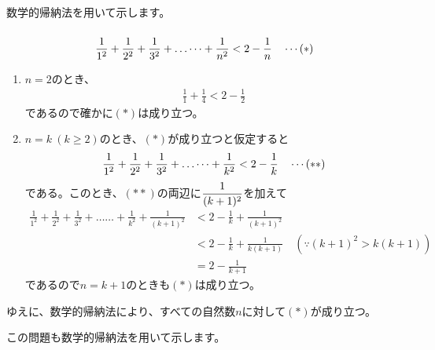 \documentclass[a4paper]{ltjsarticle}
\begin{document}

\clearpage
{}
数学的帰納法を用いて示します。

\begin{ans*}
  ${}$
  \begin{gather*}
    \frac{1}{1^2} +
    \frac{1}{2^2} +
    \frac{1}{3^2} + \dots\dots + \frac{1}{n^2} < 2 - \frac{1}{n} \quad\cdots\rm{(*)}
  \end{gather*}
  \begin{enumerate}[label=(\roman*), ref=(\roman*), itemsep=0pt]
    \item $n=2$のとき、
    \begin{gather*}
      \frac{1}{1} + \frac{1}{4} < 2 - \frac{1}{2}
    \end{gather*}
    であるので確かに$(*)$は成り立つ。
    \item $n=k\:(k\geq 2)$のとき、$(*)$が成り立つと仮定すると
    \begin{gather*}
      \frac{1}{1^2} +
      \frac{1}{2^2} +
      \frac{1}{3^2} + \dots\dots + \frac{1}{k^2} < 2 - \frac{1}{k} \quad\cdots\rm{(**)}
    \end{gather*}
    である。このとき、$(**)$の両辺に$\disp \frac{1}{(k+1)^{2}}$を加えて
    \begin{align*}
      \frac{1}{1^2} +
      \frac{1}{2^2} +
      \frac{1}{3^2} + \dots\dots + \frac{1}{k^2} + \frac{1}{(k+1)^{2}}
      &< 2 - \frac{1}{k} + \frac{1}{(k+1)^{2}} \\
      &< 2 - \frac{1}{k} + \frac{1}{k(k+1)} \quad (\because (k+1)^{2} > k(k+1)) \\
      &= 2 - \frac{1}{k+1}
    \end{align*}
    であるので$n=k+1$のときも$(*)$は成り立つ。
  \end{enumerate}
  ゆえに、数学的帰納法により、すべての自然数$n$に対して$(*)$が成り立つ。
\end{ans*}


\clearpage
{}
この問題も数学的帰納法を用いて示します。
\end{document}
